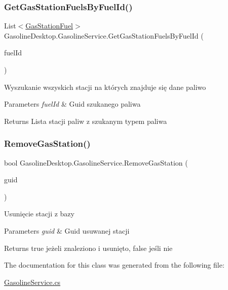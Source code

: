 \subsubsection{\texorpdfstring{GetGasStationFuelsByFuelId()}{GetGasStationFuelsByFuelId()}}
{\footnotesize\ttfamily List$<$\mbox{\hyperlink{class_gasoline_desktop_1_1_gas_station_fuel}{Gas\+Station\+Fuel}}$>$ Gasoline\+Desktop.\+Gasoline\+Service.\+Get\+Gas\+Station\+Fuels\+By\+Fuel\+Id (\begin{DoxyParamCaption}\item[{Guid}]{fuel\+Id }\end{DoxyParamCaption})}



Wyszukanie wszyskich stacji na których znajduje się dane paliwo 


\begin{DoxyParams}{Parameters}
{\em fuel\+Id} & Guid szukanego paliwa\\
\hline
\end{DoxyParams}
\begin{DoxyReturn}{Returns}
Lista stacji paliw z szukanym typem paliwa
\end{DoxyReturn}
\mbox{\label{class_gasoline_desktop_1_1_gasoline_service_a613bb5610a147c3127af3a6214fb8648}} 
\subsubsection{\texorpdfstring{RemoveGasStation()}{RemoveGasStation()}}
{\footnotesize\ttfamily bool Gasoline\+Desktop.\+Gasoline\+Service.\+Remove\+Gas\+Station (\begin{DoxyParamCaption}\item[{Guid}]{guid }\end{DoxyParamCaption})}



Usunięcie stacji z bazy 


\begin{DoxyParams}{Parameters}
{\em guid} & Guid usuwanej stacji\\
\hline
\end{DoxyParams}
\begin{DoxyReturn}{Returns}
true jeżeli znaleziono i usunięto, false jeśli nie
\end{DoxyReturn}


The documentation for this class was generated from the following file\+:\begin{DoxyCompactItemize}
\item 
\mbox{\hyperlink{_gasoline_service_8cs}{Gasoline\+Service.\+cs}}\end{DoxyCompactItemize}

